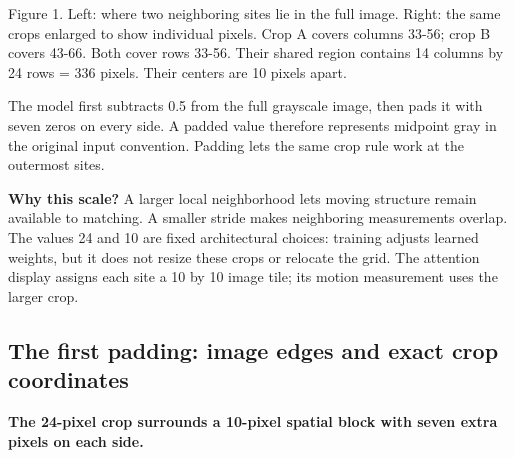 \documentclass[11pt,letterpaper]{article}
\begin{document}
\begin{center}
\end{center}

{
\small\color{muted} Figure 1. Left: where two neighboring sites lie in the full image. Right: the same crops enlarged to show individual pixels. Crop A covers columns 33-56; crop B covers 43-66. Both cover rows 33-56. Their shared region contains 14 columns by 24 rows = 336 pixels. Their centers are 10 pixels apart.\par}


The model first subtracts 0.5 from the full grayscale image, then pads it with seven zeros on every side. A padded value therefore represents midpoint gray in the original input convention. Padding lets the same crop rule work at the outermost sites.


\textbf{Why this scale?} A larger local neighborhood lets moving structure remain available to matching. A smaller stride makes neighboring measurements overlap. The values 24 and 10 are fixed architectural choices: training adjusts learned weights, but it does not resize these crops or relocate the grid. The attention display assigns each site a 10 by 10 image tile; its motion measurement uses the larger crop.


\clearpage


\clearpage
\subsection*{The first padding: image edges and exact crop coordinates}
\textbf{The 24-pixel crop surrounds a 10-pixel spatial block with seven extra pixels on each side.}
\end{document}
